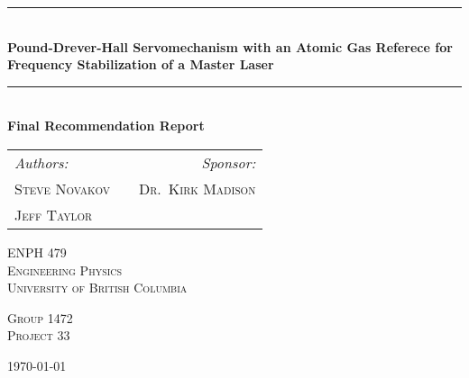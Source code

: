 \documentclass[10.5pt, a4paper, twoside]{article}
\newcommand{\HRule}{\rule{\linewidth}{0.5mm}}
\begin{document}
%
%

\begin{titlepage}
\begin{center}


\HRule \\[0.4cm]
{ \huge \bfseries Pound-Drever-Hall Servomechanism with an Atomic Gas Referece for Frequency Stabilization of a Master Laser \\[0.4cm] }

\HRule \\[1.3cm]

{ \huge \bfseries Final Recommendation Report \\[1.3cm] }


\begin{tabularx}{\linewidth}{lXr}
  \Large \emph{Authors:} & & \Large \emph{Sponsor:} \\
  \Large \textsc{Steve Novakov} & & \Large \textsc{Dr.~Kirk Madison} \\
  \Large \textsc{Jeff Taylor}  & & \\
\end{tabularx}

\vfill

\textsc{\LARGE ENPH 479}\\[0.3cm]
\textsc{\LARGE Engineering Physics}\\[0.3cm]
\textsc{\LARGE University of British Columbia}\\[0.3cm]

\vfill

\textsc{\Large Group 1472}\\[0.3cm]
\textsc{\Large Project 33}\\[0.3cm]

\vfill

{\large \today}

\end{center}
\end{titlepage}
\newpage
\end{document}
